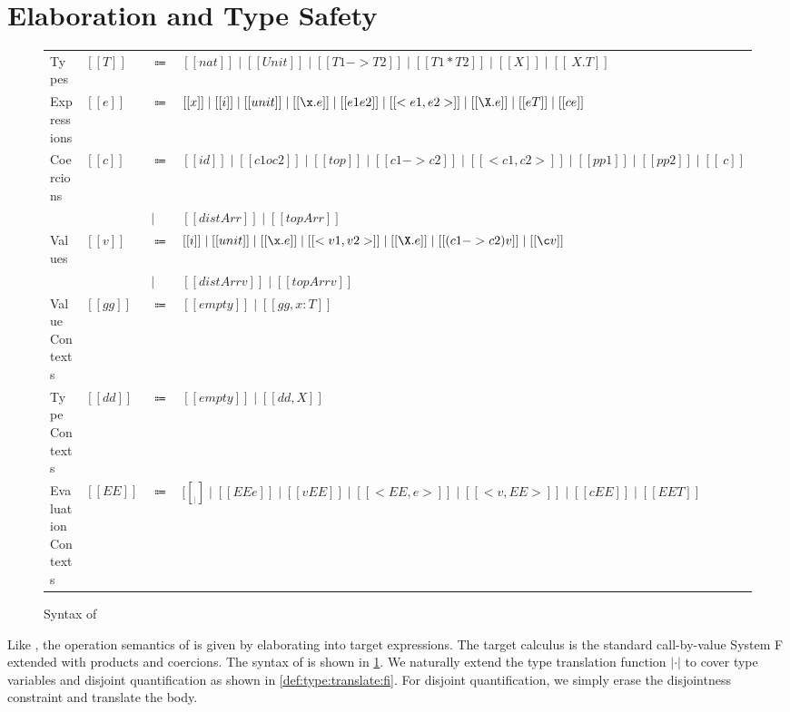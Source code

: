 
\section{Elaboration and Type Safety}
\label{sec:elaboration:fi}



\begin{figure}
  \centering
\begin{tabular}{llll} \toprule
  Types & $[[T]]$ & $\Coloneqq$ & $[[nat]] \mid [[Unit]] \mid [[T1 -> T2]]  \mid [[T1 * T2]] \mid [[X]] \mid [[\ X . T]]$\\
  Expressions & $[[e]]$ & $\Coloneqq$ & $[[x]] \mid [[i]] \mid [[unit]] \mid [[\x . e]] \mid [[e1 e2]] \mid [[< e1 , e2>]] \mid [[\X . e]] \mid [[ e T ]] \mid [[c e]]$ \\
  Coercions & $[[c]]$ & $\Coloneqq$ & $[[id]] \mid [[c1 o c2]] \mid [[top]] \mid [[c1 -> c2]] \mid [[< c1 , c2 >]] \mid [[pp1]] \mid [[pp2]] \mid [[\ c]]$ \\
  & & $\mid$ & $ [[distArr]] \mid [[topArr]] $ \\
  Values & $[[v]]$ & $\Coloneqq$ & $[[i]] \mid [[unit]] \mid [[\x . e]] \mid [[< v1 , v2>]] \mid [[\X . e]] \mid [[ (c1 -> c2) v ]] \mid [[\c v]]  $ \\
  & & $\mid$ & $ [[distArr v]] \mid [[topArr v]] $ \\
  Value Contexts & $[[gg]]$ & $\Coloneqq$ &  $[[empty]] \mid [[gg , x : T]] $ \\
  Type Contexts & $[[dd]]$ & $\Coloneqq$ &  $[[empty]] \mid [[dd , X ]] $ \\
  Evaluation Contexts & $[[EE]]$ & $\Coloneqq$ &  $  [[__]] \mid [[EE e]] \mid [[v EE]] \mid [[ < EE , e >  ]] \mid [[ < v , EE > ]] \mid [[ c EE  ]] \mid [[ EE T  ]]  $ \\ \bottomrule
\end{tabular}
\caption{Syntax of \tnamee}
\label{fig:syntax:fco}
\end{figure}


Like \namee, the operation semantics of \fnamee is given by elaborating into
target expressions. The target calculus \tnamee is the standard call-by-value
System F extended with products and coercions. The syntax of \tnamee is shown in
\cref{fig:syntax:fco}. We naturally extend the type translation function $| \cdot |$
to cover type variables and disjoint quantification as shown in \cref{def:type:translate:fi}.
For disjoint quantification, we simply erase the disjointness constraint and translate the body.

